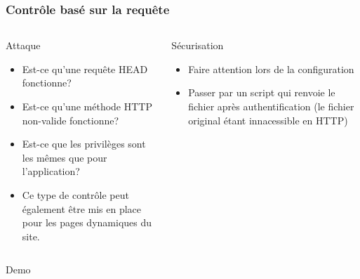 \documentclass[aspectratio=169]{beamer}  %
\newcommand{\demo}{
\begin{frame}[noframenumbering]
  \begin{center}
    \Huge Demo
  \end{center}
\end{frame}}
\begin{document}
\begin{frame}
  \frametitle{Contrôle basé sur la requête}
  \begin{columns}[T]
      \begin{alertblock}{Attaque}
        \begin{itemize}
          \item Est-ce qu'une requête HEAD fonctionne?
          \item Est-ce qu'une méthode HTTP non-valide fonctionne?
          \item Est-ce que les privilèges sont les mêmes que pour l'application?
          \item Ce type de contrôle peut également être mis en place pour les pages dynamiques du site.
        \end{itemize}
      \end{alertblock}
      \begin{exampleblock}{Sécurisation}
        \begin{itemize}
          \item Faire attention lors de la configuration
          \item Passer par un script qui renvoie le fichier après authentification (le fichier original étant innacessible en HTTP)
        \end{itemize}
      \end{exampleblock}
  \end{columns}
\end{frame}

\demo
\end{document}
